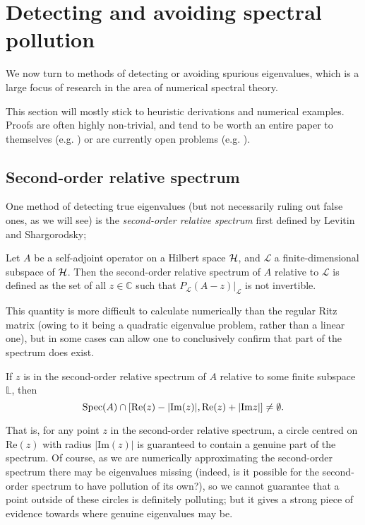 \documentclass[../main.tex]{subfiles}
\begin{document}
\section{Detecting and avoiding spectral pollution}

We now turn to methods of detecting or
avoiding spurious eigenvalues, which is a large focus of research in the area of
numerical spectral theory.

This section will mostly stick to heuristic derivations and numerical examples.
Proofs are often highly non-trivial, and tend to be worth an entire paper to
themselves (e.g. \cite{soussi2006convergence}) or are currently open problems
(e.g. \cite{chandler-wilde2012spectrum}).

\subsection{Second-order relative spectrum}
One method of detecting true eigenvalues (but not necessarily ruling out false ones,
as we will see) is the \emph{second-order relative spectrum} first defined by Levitin and Shargorodsky;

\begin{definition}
  Let $A$ be a self-adjoint operator on a Hilbert space $\mathcal{H}$, and 
  $\mathcal{L}$ a finite-dimensional subspace of $\mathcal{H}$. Then the second-order relative
  spectrum of $A$ relative to $\mathcal{L}$ is defined as the set of all $z \in \mathbb{C}$
  such that $P_{\mathcal{L}}(A - z)\big|_{\mathcal{L}}$ is not invertible.
\end{definition}

This quantity is more difficult to calculate numerically than the regular Ritz matrix (owing to
it being a quadratic eigenvalue problem, rather than a linear one), but in some cases can allow
one to conclusively confirm that part of the spectrum does exist.

\begin{theorem}
  If $z$ is in the second-order relative spectrum of $A$ relative to some finite subspace $\mathbb{L}$,
  then
    $$\mathrm{Spec}(A) \cap [\mathrm{Re}(z) - |\mathrm{Im}(z)|, \mathrm{Re}(z) + |\mathrm{Im}z|] 
    \neq \emptyset.$$
\end{theorem}

That is, for any point $z$ in the second-order relative spectrum,
a circle centred on $\mathrm{Re}(z)$ with radius $|\mathrm{Im}(z)|$ is guaranteed to contain
a genuine part of the spectrum. Of course, as we are numerically approximating the second-order
spectrum there may be eigenvalues missing (indeed, is it possible for the second-order spectrum to
have pollution of its own?), so we cannot guarantee that a point outside of these circles is
definitely polluting; but it gives a strong piece of evidence towards where genuine eigenvalues
may be.
\end{document}
